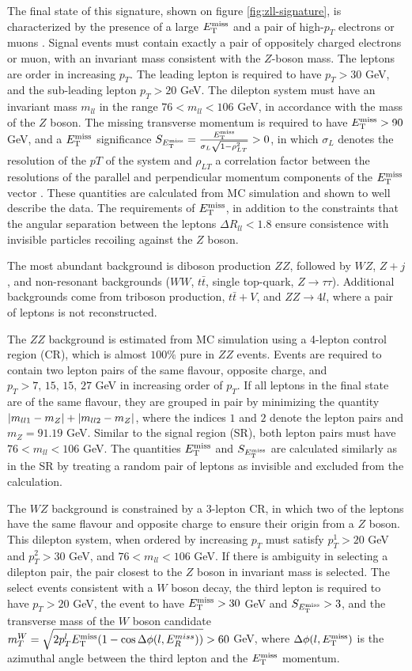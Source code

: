 The final state of this signature, shown on figure \ref{fig:zll-signature}, is characterized by the presence of a large $E_{\mathrm{T}}^{\mathrm{miss}}$ and a pair of high-$p_T$ electrons or muons \cite{HIGG-2018-26}. Signal events must contain exactly a pair of oppositely charged electrons or muon, with an invariant mass consistent with the $Z$-boson mass. The leptons are order in increasing $p_T$. The leading lepton is required to have $p_T > 30$ GeV, and the sub-leading lepton $p_T>20$ GeV. The dilepton system must have an invariant mass $m_{ll}$ in the range $76 < m_{ll} < 106$ GeV, in accordance with the mass of the $Z$ boson. The missing transverse momentum is required to have $E_{\mathrm{T}}^{\mathrm{miss}}>90$ GeV, and a $E_{\mathrm{T}}^{\mathrm{miss}}$ significance $S_{E_{\mathrm{T}}^{\mathrm{miss}}}=\frac{E_{\mathrm{T}}^{\mathrm{miss}}}{\sigma_L\sqrt{1-\rho_{LT}^2}}>0$, in which $\sigma_L$ denotes the resolution of the $pT$ of the system and $\rho_{LT}$ a correlation factor between the resolutions of the parallel and perpendicular momentum components of the $E_{\mathrm{T}}^{\mathrm{miss}}$ vector \cite{ATLAS-CONF-2018-038}. These quantities are calculated from MC simulation and shown to well describe the data. The requirements of $E_{\mathrm{T}}^{\mathrm{miss}}$, in addition to the constraints that the angular separation between the leptons $\Delta R_{ll}<1.8$ ensure consistence with invisible particles recoiling against the $Z$ boson. 

The most abundant background is diboson production $ZZ$, followed by $WZ$, $Z+j$, and non-resonant backgrounds ($WW$, $t\bar{t}$, single top-quark, $Z\rightarrow\tau\tau$). Additional backgrounds come from triboson production, $t\bar{t}+V$, and $ZZ\rightarrow 4l$, where a pair of leptons is not reconstructed. 

The $ZZ$ background is estimated from MC simulation using a 4-lepton control region (CR), which is almost $100\%$ pure in $ZZ$ events. Events are required to contain two lepton pairs of the same flavour, opposite charge, and $p_T>7,\,15,\,15,\,27$ GeV in increasing order of $p_T$. If all  leptons in the final state are of the same flavour, they are grouped in pair by minimizing the quantity $\abs{m_{ll1} - m_Z} + \abs{m_{ll2} - m_Z}$, where the indices $1$ and $2$ denote the lepton pairs and $m_Z=91.19$ GeV. Similar to the signal region (SR), both lepton pairs must have $76<m_{ll} < 106$ GeV. The quantities $E_{\mathrm{T}}^{\mathrm{miss}}$ and $S_{E_{\mathrm{T}}^{\mathrm{miss}}}$ are calculated similarly as in the SR by treating a random pair of leptons as invisible and excluded from the calculation.

The $WZ$ background is constrained by a 3-lepton CR, in which two of the leptons have the same flavour and opposite charge to ensure their origin from a $Z$ boson. This dilepton system, when ordered by increasing $p_T$ must satisfy $p_{T}^1>20$ GeV and $p_{T}^2>30$ GeV, and $76< m_{ll}< 106$ GeV. If there is ambiguity in selecting a dilepton pair, the pair closest to the $Z$ boson in invariant mass is selected. The select events consistent with a $W$ boson decay, the third lepton is required to have $p_T>20$ GeV, the event to have $E_{\mathrm{T}}^{\mathrm{miss}}>30$ GeV and $S_{E_{\mathrm{T}}^{\mathrm{miss}}}>3$, and the transverse mass of the $W$ boson candidate $m_T^W=\sqrt{2p_T^lE_{\mathrm{T}}^{\mathrm{miss}}(1-\cos\Delta\phi(l,E_R^{miss}))} > 60$ GeV, where $\Delta\phi(l, E_{\mathrm{T}}^{\mathrm{miss}})$ is the azimuthal angle between the third lepton and the $E_{\mathrm{T}}^{\mathrm{miss}}$ momentum. 

